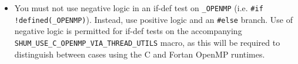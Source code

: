 \begin{itemize}
\begin{minipage}{\linewidth}
\begin{verbatim}
      \end{verbatim}
      \end{minipage}

\item You must not use negative logic in an if-def test on \verb|_OPENMP| (i.e. \verb|#if !defined(_OPENMP)|).
      Instead, use positive logic and an \verb|#else| branch.
      Use of negative logic is permitted for if-def tests on the accompanying \verb|SHUM_USE_C_OPENMP_VIA_THREAD_UTILS| macro,
      as this will be required to distinguish between cases using the C and Fortan OpenMP runtimes.

\end{itemize}


